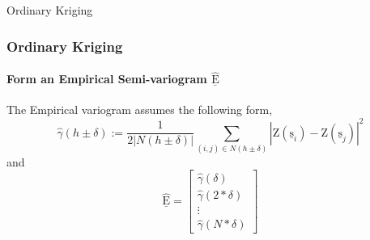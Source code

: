 \documentclass[professionalfont,10pt]{beamer}
\begin{document}
	\begin{frame}[t]{Ordinary Kriging}
	\frametitle{Ordinary Kriging}
	\framesubtitle{Form an Empirical Semi-variogram $\hat{\underline{\text{E}}}$}
		\hskip-0.75cm
		\begin{minipage}[t]{0.2\linewidth}\vspace{-0.5cm}
			\tiny\tableofcontents[currentsection,currentsubsection,hideothersubsections,subsectionstyle=show/shaded]
		\end{minipage}
		\hfill%
		\begin{minipage}[t]{0.86\linewidth}\vspace{-0.5cm}
			The Empirical variogram assumes the following form,
			\begin{equation}
				\hat{\gamma}(h \pm \delta) := \frac{1}{2|N(h\pm\delta)|}\sum_{(i,j) \in N(h\pm\delta)}|\text{Z}(\underline{\text{s}}_i) - \text{Z}(\underline{\text{s}}_j)|^2
			\end{equation}
			and
			\begin{equation}
				 \hat{\underline{\text{E}}} = 
				 \left[\begin{array}{c}
					 \hat{\gamma}(\delta)\\
					 \hat{\gamma}(2*\delta)\\
					 \vdots\\
					 \hat{\gamma}(N*\delta)
				 \end{array}\right]
			\end{equation}
		\end{minipage}
		\vfill%
	\end{frame}
\end{document}
